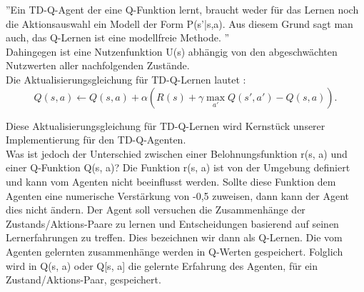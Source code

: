 ''Ein TD-Q-Agent der eine Q-Funktion lernt, braucht weder für das Lernen noch die Aktionsauswahl ein Modell der Form P(s'|s,a). Aus diesem Grund sagt man auch, das Q-Lernen ist eine modellfreie Methode. \cite[974]{Russell}'' \\

Dahingegen ist eine Nutzenfunktion U(s) abhängig von den abgeschwächten Nutzwerten aller nachfolgenden Zustände. \\

Die Aktualisierungsgleichung für TD-Q-Lernen lautet \cite[974]{Russell}: \\

\begin{equation}
Q(s,a) \leftarrow Q(s,a) + \alpha(R(s) + \gamma \max_{a'} Q(s',a') - Q(s,a)).
\end{equation}

Diese Aktualisierungsgleichung für TD-Q-Lernen wird Kernstück unserer Implementierung für den TD-Q-Agenten. \\

Was ist jedoch der Unterschied zwischen einer Belohnungsfunktion r(s, a) und einer Q-Funktion Q(s, a)? Die Funktion r(s, a) ist von der Umgebung definiert und kann vom Agenten nicht beeinflusst werden. Sollte diese Funktion dem Agenten eine numerische Verstärkung von -0,5 zuweisen, dann kann der Agent dies nicht ändern. Der Agent soll versuchen die Zusammenhänge der Zustands/Aktions-Paare zu lernen und Entscheidungen basierend auf seinen Lernerfahrungen zu treffen. Dies bezeichnen wir dann als Q-Lernen. Die vom Agenten gelernten zusammenhänge werden in Q-Werten gespeichert. Folglich wird in Q(s, a) oder Q[s, a] die gelernte Erfahrung des Agenten, für ein Zustand/Aktions-Paar, gespeichert. \\
